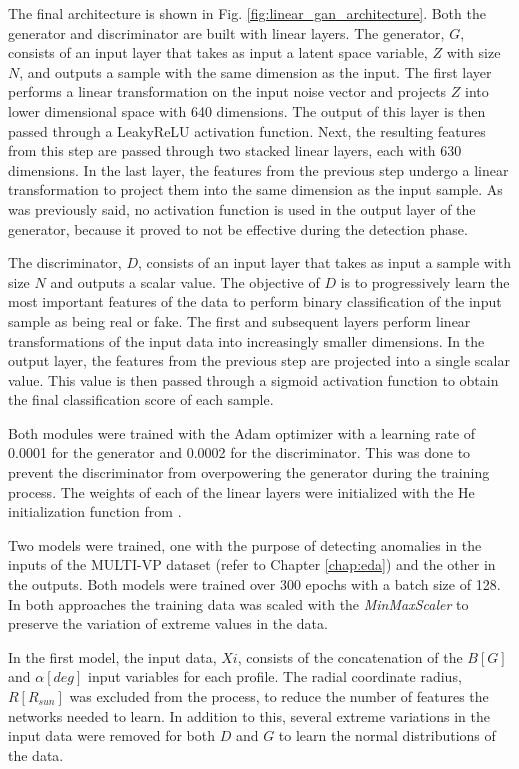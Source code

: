The final architecture is shown in Fig. \ref{fig:linear_gan_architecture}. Both the generator and discriminator are built with linear layers. The generator, $G$, consists of an input layer that takes as input a latent space variable, $Z$ with size $N$, and outputs a sample with the same dimension as the input. The first layer performs a linear transformation on the input noise vector and projects $Z$ into lower dimensional space with 640 dimensions. The output of this layer is then passed through a LeakyReLU activation function. Next, the resulting features from this step are passed through two stacked linear layers, each with 630 dimensions. In the last layer, the features from the previous step undergo a linear transformation to project them into the same dimension as the input sample. As was previously said, no activation function is used in the output layer of the generator, because it proved to not be effective during the detection phase.

The discriminator, $D$, consists of an input layer that takes as input a sample with size $N$ and outputs a scalar value. The objective of $D$ is to progressively learn the most important features of the data to perform binary classification of the input sample as being real or fake. The first and subsequent layers perform linear transformations of the input data into increasingly smaller dimensions. In the output layer, the features from the previous step are projected into a single scalar value. This value is then passed through a sigmoid activation function to obtain the final classification score of each sample.

Both modules were trained with the Adam optimizer with a learning rate of 0.0001 for the generator and 0.0002 for the discriminator. This was done to prevent the discriminator from overpowering the generator during the training process. The weights of each of the linear layers were initialized with the He initialization function from \cite{He.Zhang.ea_DelvingDeepRectifiers_2015}.

Two models were trained, one with the purpose of detecting anomalies in the inputs of the MULTI-VP dataset (refer to Chapter \ref{chap:eda}) and the other in the outputs. Both models were trained over 300 epochs with a batch size of 128. In both approaches the training data was scaled with the \textit{MinMaxScaler} to preserve the variation of extreme values in the data.

In the first model, the input data, $Xi$, consists of the concatenation of the $B [G]$ and $\alpha [deg]$ input variables for each profile. The radial coordinate radius, $R [R_{sun}]$ was excluded from the process, to reduce the number of features the networks needed to learn. In addition to this, several extreme variations in the input data were removed for both $D$ and $G$ to learn the normal distributions of the data. 

